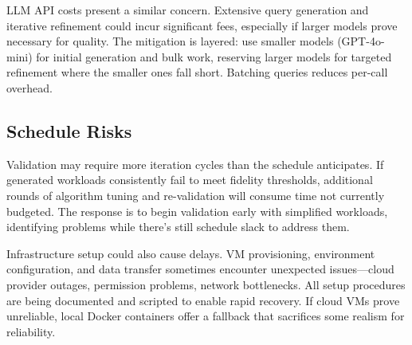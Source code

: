 \documentclass[12pt]{report}
\begin{document}
LLM API costs present a similar concern. Extensive query generation and iterative refinement could incur significant fees, especially if larger models prove necessary for quality. The mitigation is layered: use smaller models (GPT-4o-mini) for initial generation and bulk work, reserving larger models for targeted refinement where the smaller ones fall short. Batching queries reduces per-call overhead.

\subsection{Schedule Risks}
\label{subsec:schedule-risks}

Validation may require more iteration cycles than the schedule anticipates. If generated workloads consistently fail to meet fidelity thresholds, additional rounds of algorithm tuning and re-validation will consume time not currently budgeted. The response is to begin validation early with simplified workloads, identifying problems while there's still schedule slack to address them.

Infrastructure setup could also cause delays. VM provisioning, environment configuration, and data transfer sometimes encounter unexpected issues---cloud provider outages, permission problems, network bottlenecks. All setup procedures are being documented and scripted to enable rapid recovery. If cloud VMs prove unreliable, local Docker containers offer a fallback that sacrifices some realism for reliability.



\end{document}
